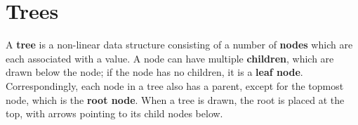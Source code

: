 \begin{comment}
\subsection{Circular buffer}

Remember that inserting and removing from the front of a dynamic array takes $O(n)$ time, so it won't make for a very good queue. One way we can get around this, however, is to use a modified version called a \textbf{circular buffer}, whose elements "wrap around" the backing array. We maintain a separate index that tells us where the buffer's elements.

If we want to remove an element from the front, we increment the index; if we want to add an element, we decrement it. If we reach the front of the array, we simply wrap around to the back of the array.


\subsection{Summary}

\begin{tabular}{| l | l | l |} \hline
    Operation              & Circular buffer  & Linked list  \\ \hline
    Access front/back      & $O(1)$           & $O(1)$       \\ \hline
    Add to front/back      & $O(1)$ amortized & $O(1)$       \\ \hline
    Remove from front/back & $O(1)$           & $O(1)$       \\ \hline
\end{tabular}
\end{comment}





\section{Trees}

A \textbf{tree} is a non-linear data structure consisting of a number of \textbf{nodes} which are each associated with a value. A node can have multiple \textbf{children}, which are drawn below the node; if the node has no children, it is a \textbf{leaf node}. Correspondingly, each node in a tree also has a parent, except for the topmost node, which is the \textbf{root node}. When a tree is drawn, the root is placed at the top, with arrows pointing to its child nodes below.

